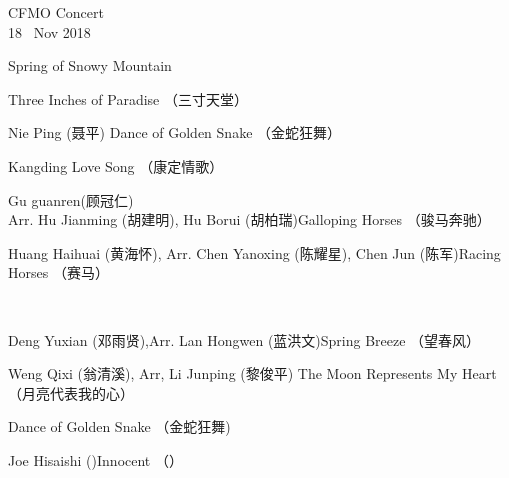 \documentclass[letter,6pt,poets]{ConcProg}
\begin{document}
\begin{programme}{
    CFMO Concert
\\  {\normalsize 18 ~Nov 2018}
}
\begin{part}[]
\begin{composition}{}{}{Spring of Snowy Mountain   }{}
    \end{composition}
    \begin{composition}{}{}{Three Inches of Paradise  （三寸天堂）}{}
    \end{composition}
    \begin{composition}{Nie Ping (聂平)} {}{Dance of Golden Snake  （金蛇狂舞）}{}
    \end{composition}
    \begin{composition}{}{}{Kangding Love Song  （康定情歌）}{}
    \end{composition}
    \begin{composition}{Gu guanren(顾冠仁)\\ Arr. Hu Jianming (胡建明), Hu Borui (胡柏瑞)}{}{Galloping Horses  （骏马奔驰）}{}
    \end{composition}
    \begin{composition}{Huang Haihuai (黄海怀), Arr. Chen Yanoxing (陈耀星), Chen Jun (陈军)}{}{Racing Horses  （赛马）}{}
    \end{composition}\\
    \begin{composition}{Deng Yuxian (邓雨贤),Arr. Lan Hongwen (蓝洪文)}{}{Spring Breeze  （望春风）}{}
    \end{composition}
    \begin{composition}{Weng Qixi (翁清溪), Arr, Li Junping (黎俊平) }{}{The Moon Represents My Heart  （月亮代表我的心）}{}
    \end{composition}
    \begin{composition}{}{}{Dance of Golden Snake  （金蛇狂舞)}{}
    \end{composition}
    \begin{composition}{Joe Hisaishi ()}{}{Innocent （） }{}
                   {}{}
    \end{composition}
    
    


\end{part}
\end{programme}
\end{document}
